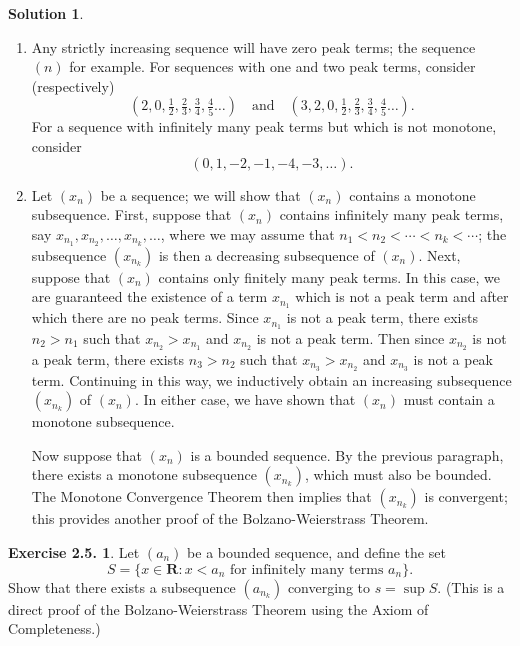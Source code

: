 \documentclass[12pt]{article}
\theoremstyle{definition}
\theoremstyle{exercise}
\newtheorem{exercise}{Exercise 2.5.}
\theoremstyle{solution}
\newtheorem*{solution}{Solution}
\newcommand{\R}{\mathbf{R}}
\begin{document}
\begin{solution}
    \begin{enumerate}
        \item Any strictly increasing sequence will have zero peak terms; the sequence \( (n) \) for example. For sequences with one and two peak terms, consider (respectively)
        \[
            \left(2, 0, \tfrac{1}{2}, \tfrac{2}{3}, \tfrac{3}{4}, \tfrac{4}{5}\ldots\right) \quad \text{and} \quad \left(3, 2, 0, \tfrac{1}{2}, \tfrac{2}{3}, \tfrac{3}{4}, \tfrac{4}{5}\ldots\right).
        \]
        For a sequence with infinitely many peak terms but which is not monotone, consider
        \[
            (0, 1, -2, -1, -4, -3, \ldots).
        \]

        \item Let \( (x_n) \) be a sequence; we will show that \( (x_n) \) contains a monotone subsequence. First, suppose that \( (x_n) \) contains infinitely many peak terms, say \( x_{n_1}, x_{n_2}, \ldots, x_{n_k}, \ldots \), where we may assume that \( n_1 < n_2 < \cdots < n_k < \cdots \); the subsequence \( (x_{n_k}) \) is then a decreasing subsequence of \( (x_n) \). Next, suppose that \( (x_n) \) contains only finitely many peak terms. In this case, we are guaranteed the existence of a term \( x_{n_1} \) which is not a peak term and after which there are no peak terms. Since \( x_{n_1} \) is not a peak term, there exists \( n_2 > n_1 \) such that \( x_{n_2} > x_{n_1} \) and \( x_{n_2} \) is not a peak term. Then since \( x_{n_2} \) is not a peak term, there exists \( n_3 > n_2 \) such that \( x_{n_3} > x_{n_2} \) and \( x_{n_3} \) is not a peak term. Continuing in this way, we inductively obtain an increasing subsequence \( (x_{n_k}) \) of \( (x_n) \). In either case, we have shown that \( (x_n) \) must contain a monotone subsequence.

        Now suppose that \( (x_n) \) is a bounded sequence. By the previous paragraph, there exists a monotone subsequence \( (x_{n_k}) \), which must also be bounded. The Monotone Convergence Theorem then implies that \( (x_{n_k}) \) is convergent; this provides another proof of the Bolzano-Weierstrass Theorem.
    \end{enumerate}
\end{solution}

\begin{exercise}
\label{ex:9}
    Let \( (a_n) \) be a bounded sequence, and define the set
    \[
        S = \{ x \in \R : x < a_n \text{ for infinitely many terms } a_n \}.
    \]
    Show that there exists a subsequence \( (a_{n_k}) \) converging to \( s = \sup S \). (This is a direct proof of the Bolzano-Weierstrass Theorem using the Axiom of Completeness.)
\end{exercise}
\end{document}
